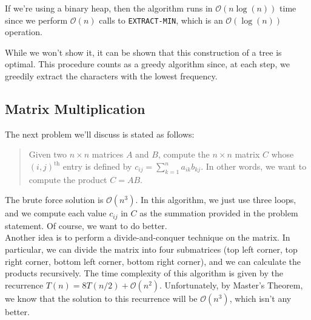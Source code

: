 If we're using a binary heap, then the algorithm runs in $\mathcal{O}(n\log(n))$ time since we perform $\mathcal{O}(n)$ calls to \verb!EXTRACT-MIN!, which is an $\mathcal{O}(\log(n))$ operation.


While we won't show it, it can be shown that this construction of a tree is optimal. This procedure counts as a greedy algorithm since, at each step, we greedily extract the characters with the lowest frequency.


\subsection{Matrix Multiplication}

The next problem we'll discuss is stated as follows:

\begin{quote}
    Given two $n\times n$ matrices $A$ and $B$, compute the $n \times n$ matrix $C$ whose $(i, j)^{\text{th}}$ entry is defined by $c_{ij} = \sum_{k=1}^{n}a_{ik} b_{kj}$. In other words, we want to compute the product $C = AB$. 
\end{quote}

The brute force solution is $\mathcal{O}(n^3)$. In this algorithm, we just use three loops, and we compute each value $c_{ij}$ in $C$ as the summation provided in the problem statement. Of course, we want to do better. \\

Another idea is to perform a divide-and-conquer technique on the matrix. In particular, we can divide the matrix into four submatrices (top left corner, top right corner, bottom left corner, bottom right corner), and we can calculate the products recursively. The time complexity of this algorithm is given by the recurrence $T(n) = 8T(n/2) + \mathcal{O}(n^2)$. Unfortunately, by Master's Theorem, we know that the solution to this recurrence will be $\mathcal{O}(n^3)$, which isn't any better. 